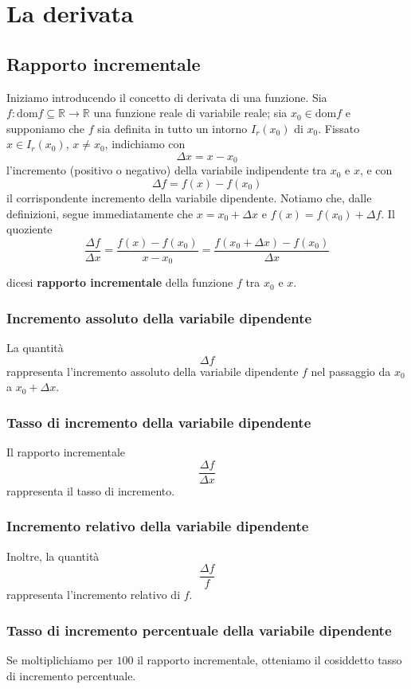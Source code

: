 \documentclass{book}
\begin{document}
\section{La derivata}
\begin{definition}
    \subsection{Rapporto incrementale}
    Iniziamo introducendo il concetto di derivata di una funzione. Sia $f: \text{dom} f \subseteq \mathbb{R} \to \mathbb{R}$ una funzione reale di variabile reale; sia $x_0 \in \text{dom} f$ e supponiamo che $f$ sia definita in tutto un intorno $I_{r}(x_0)$ di $x_0$. Fissato $x \in I_{r}(x_0)$, $x \neq x_0$, indichiamo con
    \[
        \Delta x = x - x_0
    \]
    l'incremento (positivo o negativo) della variabile indipendente tra $x_0$ e $x$, e con
    \[
        \Delta f = f(x) - f(x_0)
    \]
    il corrispondente incremento della variabile dipendente. Notiamo che, dalle definizioni, segue immediatamente che $x = x_0 + \Delta x$ e $f(x) = f(x_0) + \Delta f$. Il quoziente
    \begin{equation}
        \frac{\Delta f}{\Delta x} = \frac{f(x) - f(x_0)}{x - x_0} = \frac{f(x_0 + \Delta x) - f(x_0)}{\Delta x}
    \end{equation}

    dicesi \textbf{rapporto incrementale} della funzione $f$ tra $x_0$ e $x$.
\end{definition}
\subsubsection{Incremento assoluto della variabile dipendente}
La quantità
\[\Delta f\]
rappresenta l'incremento assoluto della variabile dipendente $f$ nel passaggio da $x_0$ a $x_0 + \Delta x$.
\subsubsection{Tasso di incremento della variabile dipendente}
Il rapporto incrementale
\[
    \frac{\Delta f}{\Delta x}
\]
rappresenta il tasso di incremento.
\subsubsection{Incremento relativo della variabile dipendente}
Inoltre, la quantità
\[\frac{\Delta f}{f}\]
rappresenta l'incremento relativo di $f$.
\subsubsection{Tasso di incremento percentuale della variabile dipendente}
Se moltiplichiamo per $100$ il rapporto incrementale, otteniamo il cosiddetto tasso di incremento percentuale.
\end{document}
